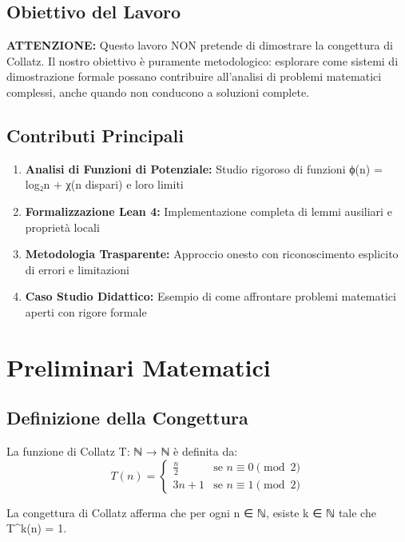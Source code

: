 \documentclass[11pt,a4paper]{article}
\begin{document}
\subsection{Obiettivo del Lavoro}

\textbf{ATTENZIONE:} Questo lavoro NON pretende di dimostrare la congettura di Collatz. Il nostro obiettivo è puramente metodologico: esplorare come sistemi di dimostrazione formale possano contribuire all'analisi di problemi matematici complessi, anche quando non conducono a soluzioni complete.

\subsection{Contributi Principali}

\begin{enumerate}
\item \textbf{Analisi di Funzioni di Potenziale:} Studio rigoroso di funzioni ϕ(n) = log₂n + χ(n dispari) e loro limiti
\item \textbf{Formalizzazione Lean 4:} Implementazione completa di lemmi ausiliari e proprietà locali
\item \textbf{Metodologia Trasparente:} Approccio onesto con riconoscimento esplicito di errori e limitazioni
\item \textbf{Caso Studio Didattico:} Esempio di come affrontare problemi matematici aperti con rigore formale
\end{enumerate}

\section{Preliminari Matematici}

\subsection{Definizione della Congettura}

La funzione di Collatz T: ℕ → ℕ è definita da:
\begin{equation}
T(n) = \begin{cases}
\frac{n}{2} & \text{se } n \equiv 0 \pmod{2} \\
3n + 1 & \text{se } n \equiv 1 \pmod{2}
\end{cases}
\end{equation}

La congettura di Collatz afferma che per ogni n ∈ ℕ, esiste k ∈ ℕ tale che T^k(n) = 1.
\end{document}
